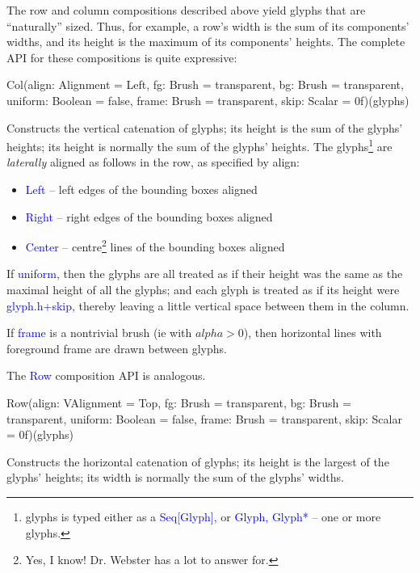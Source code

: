 \documentclass[12pt,a4paper]{article}
\def\Scala#1{\textcolor{blue}{\textsf{#1}}}
\begin{document}
The row and column compositions described above yield glyphs that
are ``naturally'' sized. Thus, for example, a row's width is the
sum of its components' widths, and its height is the maximum of its
components' heights. The complete API for these compositions is quite
expressive:
\begin{scala}
   Col(align:   Alignment = Left,
       fg:      Brush     = transparent,
       bg:      Brush     = transparent,
       uniform: Boolean   = false,
       frame:   Brush     = transparent,
       skip:    Scalar    = 0f)(glyphs)
\end{scala}
Constructs the vertical catenation of glyphs; its height is the sum of the
glyphs' heights; its height is normally the sum of the glyphs' heights.
The glyphs\footnote{glyphs is typed either as a \Scala{Seq[Glyph]}, or
\Scala{Glyph, Glyph*} -- one or more
glyphs.} are \textit{laterally} aligned as follows in the row, as specified
by align:

\begin{itemize}
\item \Scala{Left}   --   left edges of the bounding boxes aligned
\item \Scala{Right}  --   right edges of the bounding boxes aligned
\item \Scala{Center}  --  centre\footnote{Yes, I know!
Dr. Webster has a lot to answer for.} lines of the bounding boxes aligned
\end{itemize}

If \Scala{uniform}, then the glyphs are all treated as if their
height was the same as the maximal height of all the glyphs; and
each glyph is treated as if its height were \Scala{glyph.h+skip}, thereby
leaving a little vertical space between them in the column.

If \Scala{frame} is a nontrivial brush (ie with $alpha>0$), then horizontal lines
with foreground frame are drawn between glyphs.

The \Scala{Row} composition API is analogous.
\begin{scala}
   Row(align:   VAlignment = Top,
       fg:      Brush      = transparent,
       bg:      Brush      = transparent,
       uniform: Boolean    = false,
       frame:   Brush      = transparent,
       skip:    Scalar     = 0f)(glyphs)
\end{scala}

Constructs the horizontal catenation of glyphs; its height is the
largest of the glyphs' heights; its width is normally the sum of
the glyphs' widths.
\end{document}
